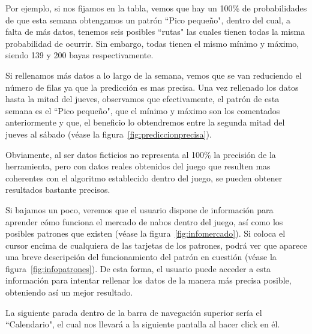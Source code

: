 Por ejemplo, si nos fijamos en la tabla, vemos que hay un 100\% de probabilidades de que esta semana obtengamos un patrón ``Pico pequeño", dentro del cual, a falta de más datos, tenemos seis posibles ``rutas" las cuales tienen todas la misma probabilidad de ocurrir. Sin embargo, todas tienen el mismo mínimo y máximo, siendo 139 y 200 bayas respectivamente.\\ 


Si rellenamos más datos a lo largo de la semana, vemos que se van reduciendo el número de filas ya que la predicción es mas precisa. Una vez rellenado los datos hasta la mitad del jueves, observamos que efectivamente, el patrón de esta semana es el ``Pico pequeño", que el mínimo y  máximo son los comentados anteriormente y que, el beneficio lo obtendremos entre la segunda mitad del jueves al sábado {(v\'ease la figura~\ref{fig:prediccionprecisa})}.\\

\clearpage

Obviamente, al ser datos ficticios no representa al 100\% la precisión de la herramienta, pero con datos reales obtenidos del juego que resulten mas coherentes con el algoritmo establecido dentro del juego, se pueden obtener resultados bastante precisos.\\


Si bajamos un poco, veremos que el usuario dispone de información para aprender cómo funciona el mercado de nabos dentro del juego, así como los posibles patrones que existen {(v\'ease la figura~\ref{fig:infomercado})}. Si coloca el cursor encima de cualquiera de las tarjetas de los patrones, podrá ver que aparece una breve descripción del funcionamiento del patrón en cuestión {(v\'ease la figura~\ref{fig:infopatrones})}. De esta forma, el usuario puede acceder a esta información para intentar rellenar los datos de la manera más precisa posible, obteniendo así un mejor resultado.\\


\clearpage

La siguiente parada dentro de la barra de navegación superior sería el ``Calendario", el cual nos llevará a la siguiente pantalla al hacer click en él.\\


